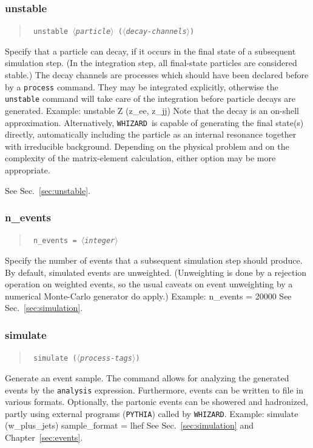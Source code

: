 \documentclass[12pt]{book}
\newenvironment{code}%
  {\begingroup\footnotesize
   \quote
   \verbatim}%
  {\endverbatim
   \endquote
   \endgroup\noindent}
\newenvironment{syntax}%
  {\begin{quote}
   \begin{flushleft}\tt}%
  {\end{flushleft}
   \end{quote}}
\newcommand{\var}[1]{$\langle$\textit{#1}$\rangle$}
\newcommand{\ttt}[1]{\texttt{#1}}
\newcommand{\whizard}{\texttt{WHIZARD}}
\newcommand{\pythia}{\texttt{PYTHIA}}
\begin{document}
\subsubsection{unstable}
\begin{syntax}
unstable \var{particle} (\var{decay-channels})
\end{syntax}
Specify that a particle can decay, if it occurs in the final state of a
subsequent simulation step.  (In the integration step, all final-state
particles are considered stable.)  The decay channels are processes which
should have been declared before by a \ttt{process} command.  They may be
integrated explicitly, otherwise the \ttt{unstable} command will take care of
the integration before particle decays are generated.  Example:
\begin{code}
unstable Z (z_ee, z_jj)
\end{code}
Note that the decay is an on-shell approximation.  Alternatively, \whizard\ is
capable of generating the final state(s) directly, automatically including the
particle as an internal resonance together with irreducible background.
Depending on the physical problem and on the complexity of the matrix-element
calculation, either option may be more appropriate.

See Sec.~\ref{sec:unstable}.


\subsubsection{n\_events}
\begin{syntax}
n\_events = \var{integer}
\end{syntax}
Specify the number of events that a subsequent simulation step should produce.
By default, simulated events are unweighted.  (Unweighting is done by a
rejection operation on weighted events, so the usual caveats on event
unweighting by a numerical Monte-Carlo generator do apply.)  Example:
\begin{code}
n_events = 20000
\end{code}
See Sec.~\ref{sec:simulation}.


\subsubsection{simulate}
\begin{syntax}
simulate (\var{process-tags})
\end{syntax}
Generate an event sample.  The command allows for analyzing the generated
events by the \ttt{analysis} expression.  Furthermore, events can be written
to file in various formats.  Optionally, the partonic events can be showered
and hadronized, partly using external programs (\pythia) called by \whizard.
Example:
\begin{code}
simulate (w_plus_jets) { sample_format = lhef }
\end{code}
See Sec.~\ref{sec:simulation} and Chapter~\ref{sec:events}.
\end{document}
